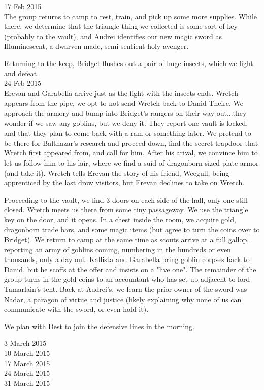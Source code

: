 \documentclass[letterpaper]{article}
\begin{document}
17 Feb 2015\\
The group returns to camp to rest, train, and pick up some more supplies. While there, we determine that the triangle thing we collected is some sort of key (probably to the vault), and Audrei identifies our new magic sword as Illuminescent, a dwarven-made, semi-sentient holy avenger.

Returning to the keep, Bridget flushes out a pair of huge insects, which we fight and defeat.\\

24 Feb 2015\\
Erevan and Garabella arrive just as the fight with the insects ends. Wretch appears from the pipe, we opt to not send Wretch back to Danid Theirc. We approach the armory and bump into Bridget's rangers on their way out...they wonder if we saw any goblins, but we deny it. They report one vault is locked, and that they plan to come back with a ram or something later. We pretend to be there for Balthazar's research and proceed down, find the secret trapdoor that Wretch first appeared from, and call for him. After his arival, we convince him to let us follow him to his lair, where we find a suid of dragonborn-sized plate armor (and take it). Wretch tells Erevan the story of his friend, Weegull, being apprenticed by the last drow visitors, but Erevan declines to take on Wretch.

Proceeding to the vault, we find 3 doors on each side of the hall, only one still closed. Wretch meets us there from some tiny passageway. We use the triangle key on the door, and it opens. In a chest inside the room, we acquire gold, dragonborn trade bars, and some magic items (but agree to turn the coins over to Bridget). We return to camp at the same time as scouts arrive at a full gallop, reporting an army of goblins coming, numbering in the hundreds or even thousands, only a day out. Kallista and Garabella bring goblin corpses back to Danid, but he scoffs at the offer and insists on a "live one". The remainder of the group turns in the gold coins to an accountant who has set up adjacent to lord Tamarlain's tent. Back at Audrei's, we learn the prior owner of the sword was Nadar, a paragon of virtue and justice (likely explaining why none of us can communicate with the sword, or even hold it). 

We plan with Dest to join the defensive lines in the morning.

3 March 2015\\

10 March 2015\\

17 March 2015\\

24 March 2015 \\

31 March 2015 \\
\end{document}
